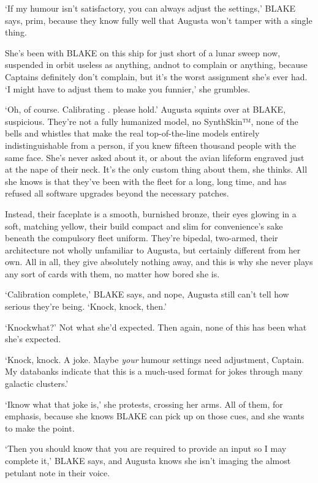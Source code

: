 `If my humour isn't satisfactory, you can always adjust the settings,'
BLAKE says, prim, because they know fully well that Augusta won't
tamper with a single thing.

She's been with BLAKE on this ship for just short of a lunar sweep
now, suspended in orbit useless as anything, and\textemdash not to
complain or anything, because Captains definitely don't complain, but
\textemdash{} it's the worst assignment she's ever had.  `I might have
to adjust them to make you funnier,' she grumbles.

`Oh, of course. Calibrating \textellipsis. please hold.' Augusta
squints over at BLAKE, suspicious. They're not a fully humanized
model, no SynthSkin™, none of the bells and whistles that make the
real top-of-the-line models entirely indistinguishable from a person,
if you knew fifteen thousand people with the same face. She's never
asked about it, or about the avian lifeform engraved just at the nape
of their neck. It's the only custom thing about them, she thinks. All
she knows is that they've been with the fleet for a long, long time,
and has refused all software upgrades beyond the necessary patches.

Instead, their faceplate is a smooth, burnished bronze, their eyes
glowing in a soft, matching yellow, their build compact and slim for
convenience's sake beneath the compulsory fleet uniform. They're
bipedal, two-armed, their architecture not wholly unfamiliar to
Augusta, but certainly different from her own. All in all, they give
absolutely nothing away, and this is why she never plays any sort of
cards with them, no matter how bored she is.

`Calibration complete,' BLAKE says, and nope, Augusta still can't tell
how serious they're being. `Knock, knock, then.'

`Knock\textemdash what?' Not what she'd expected. Then again, none
of this has been what she's expected.

`Knock, knock. A joke. Maybe \emph{your} humour settings need
adjustment, Captain. My databanks indicate that this is a much-used
format for jokes through many galactic clusters.'

`I\textemdash know what that joke is,' she protests, crossing her
arms. All of them, for emphasis, because she knows BLAKE can pick up
on those cues, and she wants to make the point.

`Then you should know that you are required to provide an input so I
may complete it,' BLAKE says, and Augusta knows she isn't imaging the
almost petulant note in their voice.

